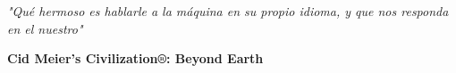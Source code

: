 
\newpage


\textit{"Qué hermoso es hablarle a la máquina en su propio idioma, y que nos responda en el nuestro"}

\textbf{Cid Meier's Civilization®: Beyond Earth}
